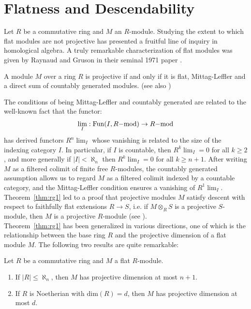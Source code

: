 \chapter{Flatness and Descendability}

Let $R$ be a commutative ring and $M$ an $R$-module. Studying the extent to which flat modules are not projective has presented a fruitful 
line of inquiry in homological algebra. 
A truly remarkable characterization of flat modules was given by Raynaud and Gruson in their seminal 1971 paper \cite{Raynaud1971}.
\begin{theorem}\label{thm:rg1}
A module $M$ over a ring $R$ is projective if and only if it is flat, Mittag-Leffler and a direct sum of countably generated modules. 
\cite[Theorem 2.2.1]{Raynaud1971} (see also \cite[Tag 059Z]{sp})
\end{theorem}
The conditions of being Mittag-Leffler and countably generated are related to the well-known fact that the functor:
\[\operatorname*{lim}_{I}: \operatorname{Fun}(I, {R}\mathrm{-mod}) \rightarrow {R}\mathrm{-mod}\]
has derived functors $R^n\lim_{I}$ whose vanishing is related to the size of the indexing category $I$.
In particular, if $I$ is countable, then $R^k\lim_I = 0$ for all $k \geq 2$, and more generally if $|I|< \aleph_n$
then $R^k\lim_I = 0$ for all $k \geq n+1$. After writing $M$ as a filtered colimit of finite free $R$-modules,
the countably generated assumption allows us to regard $M$ as a filtered colimit indexed by a countable category, 
and the Mittag-Leffler condition ensures a vanishing of $R^1\lim_I$. Theorem~\ref{thm:rg1}
led to a proof that projective modules $M$ satisfy descent with respect to faithfully flat extensions $R \to S$, i.e. if
$M \otimes_R S$ is a projective $S$-module, then $M$ is a projective $R$-module (see \cite[Tag 05A4]{sp}).\\
\indent Theorem~\ref{thm:rg1} has been generalized in various directions, one of which is the relationship between the base ring $R$ and the projective
dimension of a flat module $M$. The following two results are quite remarkable:
\begin{theorem}\label{thm:gj0}
Let $R$ be a commutative ring and $M$ a flat $R$-module.
\begin{enumerate}
\item If $|R| \leq \aleph_n$, then $M$ has projective dimension at most $n+1$. \cite[Theorem 7.10]{gj}
\item If $R$ is Noetherian with $\text{dim}(R) = d$, then $M$ has projective dimension at most $d$. \cite[Corollary 7.2]{gj}
\end{enumerate}
\end{theorem}
